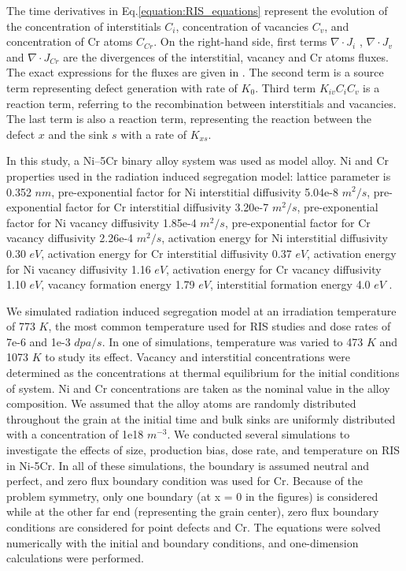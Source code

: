 \documentclass[utf8]{frontiersSCNS} %
\begin{document}
The time derivatives in Eq.\ref{equation:RIS_equations} represent the evolution of the concentration of interstitials ${C_i}$,  concentration of vacancies ${C_v}$,  and concentration of Cr atoms ${C_{Cr}}$.   On the right-hand side, first terms ${\nabla\cdot J_i}$ , ${\nabla\cdot J_v}$ and ${\nabla\cdot J_{Cr}}$ are the divergences of the interstitial, vacancy and Cr atoms fluxes. The exact expressions for the fluxes are given in \citep{barr_grain_2015}. The second term is a source term representing defect generation with rate of $K_0$. Third term ${K_{iv}C_iC_v}$ is a reaction term, referring to the recombination between interstitials and vacancies. The last term is also a reaction term, representing the reaction between the defect $x$ and the sink $s$ with a rate of ${K_{xs}}$.

In this study, a Ni–5Cr binary alloy system was used as model alloy. Ni and Cr properties used in the radiation induced segregation model: lattice parameter is 0.352 $nm$, pre-exponential factor for Ni interstitial diffusivity 5.04e-8 $m^2/s$, pre-exponential factor for Cr interstitial diffusivity 3.20e-7 $m^2/s$, pre-exponential factor for Ni vacancy diffusivity 1.85e-4 $m^2/s$, pre-exponential factor for Cr vacancy diffusivity 2.26e-4 $m^2/s$, activation energy for Ni interstitial diffusivity 0.30 $eV$, activation energy for Cr interstitial diffusivity 0.37 $eV$, activation energy for Ni vacancy diffusivity 1.16 $eV$, activation energy for Cr vacancy diffusivity 1.10 $eV$, vacancy formation energy 1.79 $eV$, interstitial formation energy 4.0 $eV$ \citep{barr_grain_2015}.

We simulated radiation induced segregation model at an irradiation temperature of 773 $K$, the most common temperature used for RIS studies \citep{allen_thermal_2007,wharry_systematic_2013,barnard_ab_2014,barr_grain_2015} and dose rates of 7e-6 and 1e-3 $dpa/s$. In one of simulations, temperature was varied to 473 $K$ and 1073 $K$ to study its effect. Vacancy and interstitial concentrations were determined as the concentrations at thermal equilibrium for the initial conditions of system. Ni and Cr concentrations are taken as the nominal value in the alloy composition. We assumed that the alloy atoms are randomly distributed throughout the grain at the initial time and bulk sinks are uniformly distributed with a concentration of 1e18 $m^{-3}$. We conducted several simulations to investigate the effects of size, production bias, dose rate, and temperature on RIS in Ni-5Cr. In all of these simulations, the boundary is assumed neutral and perfect, and zero flux boundary condition was used for Cr. Because of the problem symmetry, only one boundary (at x = 0 in the figures) is considered while at the other far end (representing the grain center), zero flux boundary conditions are considered for point defects and Cr. The equations were solved numerically with the initial and boundary conditions, and one-dimension calculations were performed.
\end{document}
